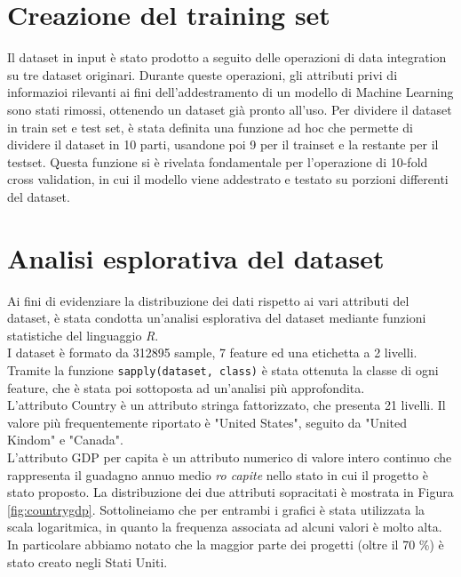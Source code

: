 \section{Creazione del training set}
Il dataset in input è stato prodotto a seguito delle operazioni di data integration su tre dataset originari. Durante queste operazioni, gli attributi privi di informazioi rilevanti ai fini dell'addestramento di un modello di Machine Learning sono stati rimossi, ottenendo un dataset già pronto all'uso. Per dividere il dataset in train set e test set, è stata definita una funzione ad hoc che permette di dividere il dataset in 10 parti, usandone poi 9 per il trainset e la restante per il testset. Questa funzione si è rivelata fondamentale per l'operazione di 10-fold cross validation, in cui il modello viene addestrato e testato su porzioni differenti del dataset.

\section{Analisi esplorativa del dataset}
Ai fini di evidenziare la distribuzione dei dati rispetto ai vari attributi del dataset, è stata condotta un'analisi esplorativa del dataset mediante funzioni statistiche del linguaggio \emph{R}.\\
I dataset è formato da 312895 sample, 7 feature ed una etichetta a 2 livelli.
Tramite la funzione \texttt{sapply(dataset, class)} è stata ottenuta la classe di ogni feature, che è stata poi sottoposta ad un'analisi più approfondita.\\
L'attributo Country è un attributo stringa fattorizzato, che presenta 21 livelli. Il valore più frequentemente riportato è "United States", seguito da "United Kindom" e "Canada".\\
L'attributo GDP per capita è un attributo numerico di valore intero continuo che rappresenta il guadagno annuo medio \textit{ro capite} nello stato in cui il progetto è stato proposto. La distribuzione dei due attributi sopracitati è mostrata in Figura \ref{fig:countrygdp}. Sottolineiamo che per entrambi i grafici è stata utilizzata la scala logaritmica, in quanto la frequenza associata ad alcuni valori è molto alta. In particolare abbiamo notato che la maggior parte dei progetti (oltre il 70 \%) è stato creato negli Stati Uniti.

